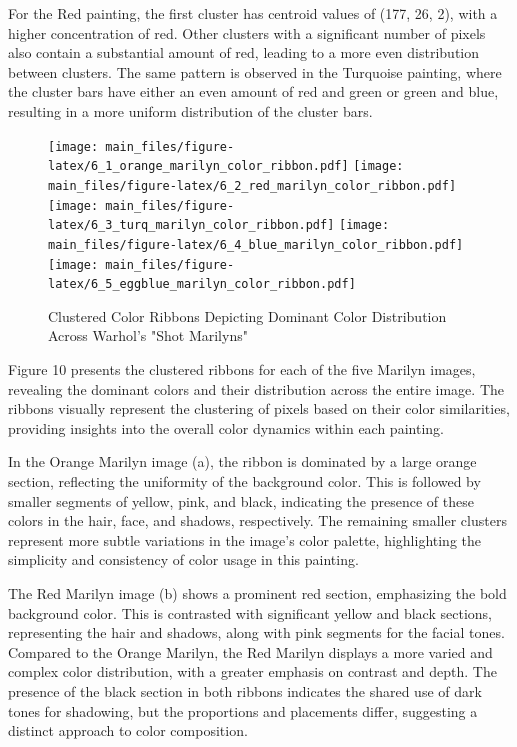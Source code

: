 \documentclass{article}
\begin{document}
For the Red painting, the first cluster has centroid values of (177, 26,
2), with a higher concentration of red. Other clusters with a
significant number of pixels also contain a substantial amount of red,
leading to a more even distribution between clusters. The same pattern
is observed in the Turquoise painting, where the cluster bars have
either an even amount of red and green or green and blue, resulting in a
more uniform distribution of the cluster bars.

\begin{figure}[htbp]
    \centering
        {\texttt{[image: main\_files/figure-latex/6\_1\_orange\_marilyn\_color\_ribbon.pdf]}}
        {\texttt{[image: main\_files/figure-latex/6\_2\_red\_marilyn\_color\_ribbon.pdf]}}
        {\texttt{[image: main\_files/figure-latex/6\_3\_turq\_marilyn\_color\_ribbon.pdf]}}
        {\texttt{[image: main\_files/figure-latex/6\_4\_blue\_marilyn\_color\_ribbon.pdf]}}
        {\texttt{[image: main\_files/figure-latex/6\_5\_eggblue\_marilyn\_color\_ribbon.pdf]}}
    \caption{Clustered Color Ribbons Depicting Dominant Color Distribution Across Warhol's "Shot Marilyns"}
\end{figure}

Figure 10 presents the clustered ribbons for each of the five Marilyn
images, revealing the dominant colors and their distribution across the
entire image. The ribbons visually represent the clustering of pixels
based on their color similarities, providing insights into the overall
color dynamics within each painting.

In the Orange Marilyn image (a), the ribbon is dominated by a large
orange section, reflecting the uniformity of the background color. This
is followed by smaller segments of yellow, pink, and black, indicating
the presence of these colors in the hair, face, and shadows,
respectively. The remaining smaller clusters represent more subtle
variations in the image's color palette, highlighting the simplicity and
consistency of color usage in this painting.

The Red Marilyn image (b) shows a prominent red section, emphasizing the
bold background color. This is contrasted with significant yellow and
black sections, representing the hair and shadows, along with pink
segments for the facial tones. Compared to the Orange Marilyn, the Red
Marilyn displays a more varied and complex color distribution, with a
greater emphasis on contrast and depth. The presence of the black
section in both ribbons indicates the shared use of dark tones for
shadowing, but the proportions and placements differ, suggesting a
distinct approach to color composition.
\end{document}
